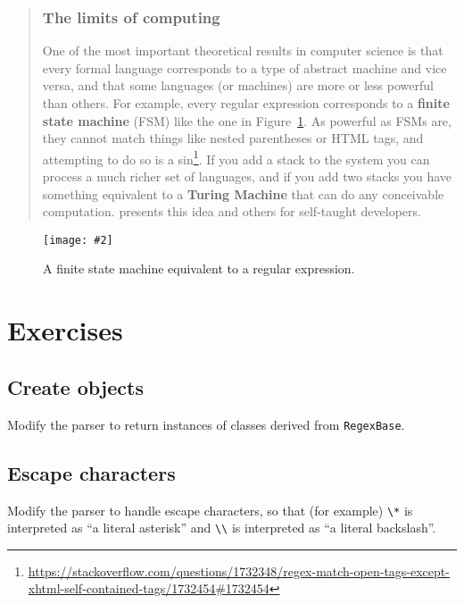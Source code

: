 \documentclass[krantzl]{krantz}
\newcommand{\figpdf}[4]{\begin{figure}%
\centering%
\texttt{[image: \#2]}%
\caption{#3}%
\label{#1}%
\end{figure}}
\newcommand{\figref}[1]{Figure~\ref{#1}}
\newcommand{\glossref}[1]{\textbf{#1}}
\newenvironment{callout}{\savenotes\begin{tBox}\begin{quotation}\toggletrue{inbox}\renewcommand{\thempfootnote}{\arabic{footnote}}}{\end{quotation}\vspace{\baselineskip}\end{tBox}\togglefalse{inbox}\spewnotes}
\newcommand{\hreffoot}[2]{{#1}\footnote{\href{#2}{#2}}}
\begin{document}
\begin{callout}


\subsubsection*{The limits of computing}


One of the most important theoretical results in computer science is that
every formal language corresponds to a type of abstract machine and vice versa,
and that some languages (or machines) are more or less powerful than others.
For example,
every regular expression corresponds to a \glossref{finite state machine} (FSM)
like the one in \figref{regex-parser-finite-state-machine}.
As powerful as FSMs are,
they cannot match things like nested parentheses or HTML tags,
and \hreffoot{attempting to do so is a sin}{https://stackoverflow.com/questions/1732348/regex-match-open-tags-except-xhtml-self-contained-tags/1732454\#1732454}.
If you add a stack to the system you can process a much richer set of languages,
and if you add two stacks you have something equivalent to a \glossref{Turing Machine}
that can do any conceivable computation.
\cite{Conery2021} presents this idea and others for self-taught developers.

\end{callout}

\figpdf{regex-parser-finite-state-machine}{./regex-parser/finite-state-machine.pdf}{A finite state machine equivalent to a regular expression.}{0.6}

\section{Exercises}\label{regex-parser-exercises}

\subsection*{Create objects}


Modify the parser to return instances of classes derived from \texttt{RegexBase}.

\subsection*{Escape characters}


Modify the parser to handle escape characters,
so that (for example) \texttt{{\textbackslash}*} is interpreted as “a literal asterisk”
and \texttt{{\textbackslash}{\textbackslash}} is interpreted as “a literal backslash”.
\end{document}
